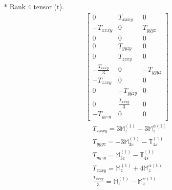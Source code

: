 \documentclass[fleqn,8pt,landscape]{jsarticle}
\begin{document}
* Rank 4 tensor (t).
\begin{align*}
\begin{bmatrix} 0 & T_{xxxy} & 0 \\ - T_{xxxy} & 0 & T_{yyyz} \\ 0 & 0 & 0 \\ 0 & T_{yyzy} & 0 \\ 0 & T_{zzxy} & 0 \\ - \frac{T_{xxxy}}{3} & 0 & - T_{yyyz} \\ - T_{zzxy} & 0 & 0 \\ 0 & - T_{yyzy} & 0 \\ 0 & \frac{T_{xxxy}}{3} & 0 \\ - T_{yyzy} & 0 & 0 \end{bmatrix}
\end{align*}
\begin{align*}
& T_{xxxy} = 3 \mathbb{M}_{z}^{(1)} - 3 \mathbb{M}_{z}^{\alpha(1)} \\
& T_{yyyz} = - 3 \mathbb{M}_{3c}^{(1)} - \mathbb{T}_{4s}^{(1)} \\
& T_{yyzy} = \mathbb{M}_{3c}^{(1)} - \mathbb{T}_{4s}^{(1)} \\
& T_{zzxy} = \mathbb{M}_{z}^{(1)} + 4 \mathbb{M}_{z}^{\alpha(1)} \\
& \frac{T_{xxxy}}{3} = \mathbb{M}_{z}^{(1)} - \mathbb{M}_{z}^{\alpha(1)}
\end{align*}
\end{document}
